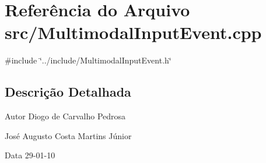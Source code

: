 \section{Referência do Arquivo src/MultimodalInputEvent.cpp}
\label{MultimodalInputEvent_8cpp}
{\ttfamily \#include \char`\"{}../include/MultimodalInputEvent.h\char`\"{}}\par


\subsection{Descrição Detalhada}
\begin{DoxyAuthor}{Autor}
Diogo de Carvalho Pedrosa 

José Augusto Costa Martins Júnior 
\end{DoxyAuthor}
\begin{DoxyDate}{Data}
29-\/01-\/10 
\end{DoxyDate}
